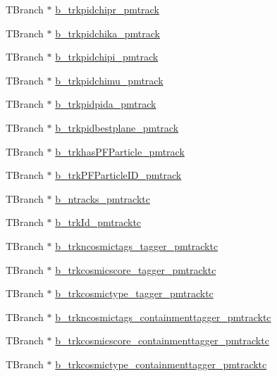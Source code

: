 \begin{DoxyCompactItemize}
\item 
T\-Branch $\ast$ \hyperlink{classanatree_a0c87e9cc9c6e339d60baed587df0db61}{b\-\_\-trkpidchipr\-\_\-pmtrack}
\item 
T\-Branch $\ast$ \hyperlink{classanatree_a47a5da30cd975206c3255d43a4c77c3a}{b\-\_\-trkpidchika\-\_\-pmtrack}
\item 
T\-Branch $\ast$ \hyperlink{classanatree_a1b78928cede5261d5aad7f4954b25ca1}{b\-\_\-trkpidchipi\-\_\-pmtrack}
\item 
T\-Branch $\ast$ \hyperlink{classanatree_a093ac3df7a027f6fa3ccb1d1bf1f1a96}{b\-\_\-trkpidchimu\-\_\-pmtrack}
\item 
T\-Branch $\ast$ \hyperlink{classanatree_ae5b0e3947ef8c6150ef24991f7c0328c}{b\-\_\-trkpidpida\-\_\-pmtrack}
\item 
T\-Branch $\ast$ \hyperlink{classanatree_ae4dd7a75e9b3054ad5d20421d4c82a5a}{b\-\_\-trkpidbestplane\-\_\-pmtrack}
\item 
T\-Branch $\ast$ \hyperlink{classanatree_a8a334c6eb01caec5a05d3e0a8b8f614c}{b\-\_\-trkhas\-P\-F\-Particle\-\_\-pmtrack}
\item 
T\-Branch $\ast$ \hyperlink{classanatree_a005ca19c48ded398b5954cdb22a51fd5}{b\-\_\-trk\-P\-F\-Particle\-I\-D\-\_\-pmtrack}
\item 
T\-Branch $\ast$ \hyperlink{classanatree_a8eca92e362ccabbecdeeb378893b3454}{b\-\_\-ntracks\-\_\-pmtracktc}
\item 
T\-Branch $\ast$ \hyperlink{classanatree_a57123eac106f498e4e9e38460b8417d9}{b\-\_\-trk\-Id\-\_\-pmtracktc}
\item 
T\-Branch $\ast$ \hyperlink{classanatree_ae4722fdeec62aee3d07a17e9f16aa256}{b\-\_\-trkncosmictags\-\_\-tagger\-\_\-pmtracktc}
\item 
T\-Branch $\ast$ \hyperlink{classanatree_ab39e90eb53f753449c0e792f647889e8}{b\-\_\-trkcosmicscore\-\_\-tagger\-\_\-pmtracktc}
\item 
T\-Branch $\ast$ \hyperlink{classanatree_a59d1660a9033d63bb26c5678f8520463}{b\-\_\-trkcosmictype\-\_\-tagger\-\_\-pmtracktc}
\item 
T\-Branch $\ast$ \hyperlink{classanatree_a2db1a9487f1fc49cd291523a7a4253d8}{b\-\_\-trkncosmictags\-\_\-containmenttagger\-\_\-pmtracktc}
\item 
T\-Branch $\ast$ \hyperlink{classanatree_ac3973da95c7700d038d03e167f5b3a45}{b\-\_\-trkcosmicscore\-\_\-containmenttagger\-\_\-pmtracktc}
\item 
T\-Branch $\ast$ \hyperlink{classanatree_aecfd7b8915425dfa69326efbe4a71037}{b\-\_\-trkcosmictype\-\_\-containmenttagger\-\_\-pmtracktc}

\end{DoxyCompactItemize}
